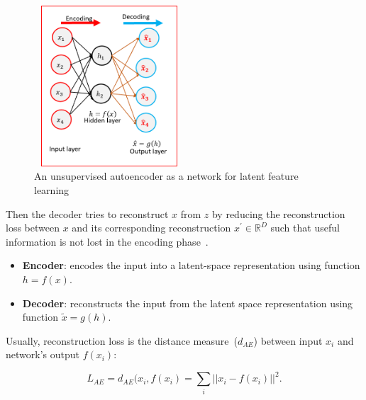 \begin{figure}[h]
    \centering
    \includegraphics[width=0.5\textwidth,height=60mm]{images/ae_1.png}
    \caption{An unsupervised autoencoder as a network for latent feature learning~\cite{karimDLTF2018}}
    \label{fig:ae_theory1}
    \vspace{-2mm}
\end{figure}

\hspace*{3.5mm} Then the decoder tries to reconstruct $x$ from $z$ by reducing the reconstruction loss between $x$ and its corresponding reconstruction $x^{\prime} \in \mathbb{R}^{D}$ such that useful information is not lost in the encoding phase~\cite{KarimIEEEAccess2019}.

\vspace{-2mm}
\begin{itemize}[noitemsep]
    \item \textbf{Encoder}: encodes the input into a latent-space representation using function $h = f(x)$.
    \item \textbf{Decoder}: reconstructs the input from the latent space representation using function $\tilde{x} = g(h)$. 
\end{itemize}
\vspace{-2mm}

Usually, reconstruction loss is the distance measure~($d_{AE}$) between input $x_i$ and network's output $f(x_i)$: 

\vspace{-2mm}
\begin{equation}
    L_{AE}=\text{$d_{AE}$}(x_i, f(x_i) = \sum_{i} ||x_{i}-f(x_i)||^{2}.
    \label{eq:Loss1}
\end{equation}

